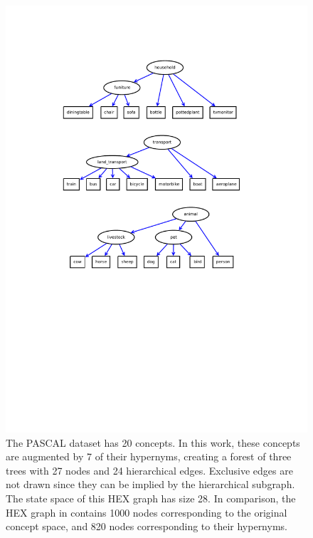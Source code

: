 \documentclass[11pt,a4paper]{article}
\begin{document}
\begin{figure}[p]
\centering
\includegraphics[scale=1.1]{full.pdf}
\caption{The PASCAL dataset has 20 concepts. In this work, these concepts are augmented by 7 of their hypernyms, creating a forest of three trees with 27 nodes and 24 hierarchical edges. Exclusive edges are not drawn since they can be implied by the hierarchical subgraph. The state space of this HEX graph has size 28. In comparison, the HEX graph in \cite{deng2014large} contains 1000 nodes corresponding to the original concept space, and 820 nodes corresponding to their hypernyms.}
\label{fig:hex}
\end{figure}
\end{document}
